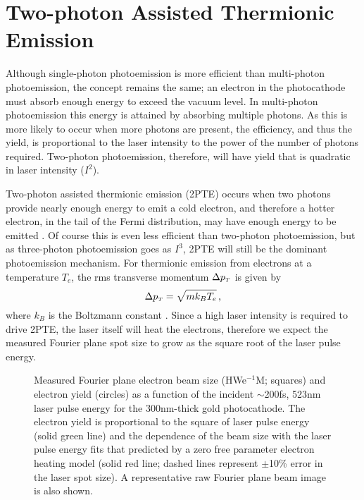 
\section{Two-photon Assisted Thermionic Emission} \label{sec:two_photon_thermionic}

Although single-photon photoemission is more efficient than multi-photon photoemission, the concept remains the same; an electron in the photocathode must absorb enough energy to exceed the vacuum level.
In multi-photon photoemission this energy is attained by absorbing multiple photons.
As this is more likely to occur when more photons are present, the efficiency, and thus the yield, is proportional to the laser intensity to the power of the number of photons required.
Two-photon photoemission, therefore, will have yield that is quadratic in laser intensity ($I^2$).

Two-photon assisted thermionic emission (2PTE) occurs when two photons provide nearly enough energy to emit a cold electron, and therefore a hotter electron, in the tail of the Fermi distribution, may have enough energy to be emitted \cite{yen_thermally_1980}.
Of course this is even less efficient than two-photon photoemission, but as three-photon photoemission goes as $I^3$, 2PTE will still be the dominant photoemission mechanism.
For thermionic emission from electrons at a temperature $T_e$, the rms transverse momentum $\Delta p_{{\scriptscriptstyle T}}$ is given by 
\begin{equation}
  \Delta p_{{\scriptscriptstyle T}} = \sqrt{m k_B T_e} \,\text{,}
\end{equation}
where $k_B$ is the Boltzmann constant \cite{dowell_quantum_2009,jensen_emittance_2010}.
Since a high laser intensity is required to drive 2PTE, the laser itself will heat the electrons, therefore we expect the measured Fourier plane spot size to grow as the square root of the laser pulse energy.

\begin{figure}
  \centering
  
  \caption[Measured Fourier plane electron beam size and yield vs incident laser pulse energy on gold photocathode]{
    Measured Fourier plane electron beam size (HWe$^{-1}$M; squares) and electron yield (circles) as a function of the incident $\sim$200fs, 523nm laser pulse energy for the 300nm-thick gold photocathode.
    The electron yield is proportional to the square of laser pulse energy (solid green line) and the dependence of the beam size with the laser pulse energy fits that predicted by a zero free parameter electron heating model (solid red line; dashed lines represent $\pm$10\% error in the laser spot size).
    A representative raw Fourier plane beam image is also shown.
  }
  \label{fig:gold-emission}
\end{figure}

